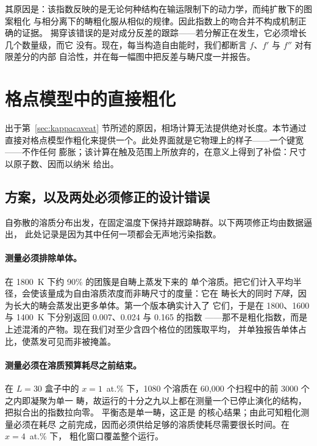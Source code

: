 \documentclass[11pt,a4paper]{ctexart}
\begin{document}
其原因是：该指数反映的是无论何种结构在输运限制下的动力学，而纯扩散下的图案粗化
与相分离下的畴粗化服从相似的规律。因此指数上的吻合并不构成机制正确的证据。
揭穿该错误的是对成分反差的跟踪——若分解正在发生，它必须增长几个数量级，而它
没有。现在，每当构造自由能时，我们都断言 $f$、$f'$ 与 $f''$ 对有限差分的内部
自洽性，并在每一幅图中把反差与畴尺度一并报告。


\section{格点模型中的直接粗化}
\label{sec:latticecoarsen}

出于第~\ref{sec:kappacaveat} 节所述的原因，相场计算无法提供绝对长度。本节通过
直接对格点模型作粗化来提供一个。此处界面就是它物理上的样子——一个键宽——不作任何
膨胀；该计算在触及范围上所放弃的，在意义上得到了补偿：尺寸以原子数、因而以纳米
给出。

\subsection{方案，以及两处必须修正的设计错误}

自弥散的溶质分布出发，在固定温度下保持并跟踪畴群。以下两项修正均由数据逼出，
此处记录是因为其中任何一项都会无声地污染指数。

\paragraph{测量必须排除单体。} 在 1800~K 下约 90\% 的团簇是自畴上蒸发下来的
单个溶质。把它们计入平均半径，会使该量成为自由溶质浓度而非畴尺寸的度量：它在
畴长大的同时\emph{下降}，因为长大的畴会蒸发出更多单体。第一个版本确实计入了
它们，于是在 1800、1600 与 1400~K 下分别返回 0.007、0.024 与 0.165 的指数
——那不是粗化指数，而是上述混淆的产物。现在我们对至少含四个格位的团簇取平均，
并单独报告单体占比，使蒸发可见而非被掩盖。

\paragraph{测量必须在溶质预算耗尽之前结束。} 在 $L = 30$ 盒子中的
$x = 1$~at.\% 下，1080 个溶质在 60{,}000 个扫程中的前 3000 个之内即凝聚为单一
畴，故运行的十分之九以上都在测量一个已停止演化的结构，把拟合出的指数拉向零。
平衡态是单一畴，这正是 \citet{yu2026b} 的核心结果；由此可知粗化测量必须在耗尽
之前完成，因而必须供给足够的溶质使耗尽需要很长时间。在 $x = 4$~at.\% 下，
粗化窗口覆盖整个运行。
\end{document}
